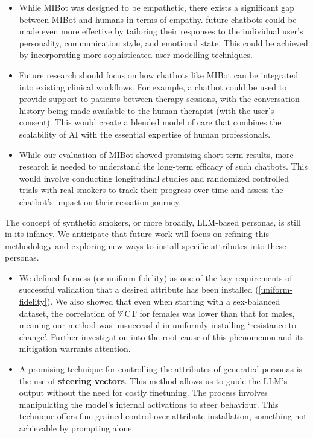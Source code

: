 \begin{itemize}
    \item While MIBot was designed to be empathetic, there exists a significant gap between MIBot and humans in terms of empathy. future chatbots could be made even more effective by tailoring their responses to the individual user's personality, communication style, and emotional state. This could be achieved by incorporating more sophisticated user modelling techniques.
    \item Future research should focus on how chatbots like MIBot can be integrated into existing clinical workflows. For example, a chatbot could be used to provide support to patients between therapy sessions, with the conversation history being made available to the human therapist (with the user's consent). This would create a blended model of care that combines the scalability of AI with the essential expertise of human professionals.
    \item While our evaluation of MIBot showed promising short-term results, more research is needed to understand the long-term efficacy of such chatbots. This would involve conducting longitudinal studies and randomized controlled trials with real smokers to track their progress over time and assess the chatbot's impact on their cessation journey.
\end{itemize}


The concept of synthetic smokers, or more broadly, LLM-based personas, is still in its infancy. We anticipate that future work will focus on refining this methodology and exploring new ways to install specific attributes into these personas.

\begin{itemize}
    \item  We defined fairness (or uniform fidelity) as one of the key requirements of successful validation that a desired attribute has been installed (\cref{uniform-fidelity}). We also showed that even when starting with a sex-balanced dataset, the correlation of \%CT for females was lower than that for males, meaning our method was unsuccessful in uniformly installing `resistance to change'. Further investigation into the root cause of this phenomenon and its mitigation warrants attention. 

    \item A promising technique for controlling the attributes of generated personas is the use of \textbf{steering vectors}. This method allows us to guide the LLM's output without the need for costly finetuning. The process involves manipulating the model's internal activations to steer behaviour. This technique offers fine-grained control over attribute installation, something not achievable by prompting alone.
\end{itemize}

